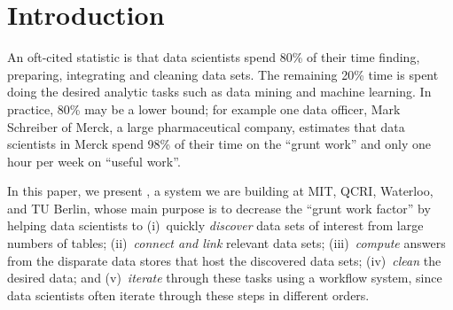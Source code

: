 \section{Introduction}
\label{introduction}

An oft-cited statistic is that data scientists spend 80\% of their time finding, preparing, integrating and cleaning data sets. The remaining 20\% time is spent doing the desired analytic tasks such as data mining and machine learning. In practice, 80\% may be a lower bound; for example one data officer, Mark Schreiber of Merck, a large pharmaceutical company, estimates that data scientists in Merck spend 98\% of their time on the ``grunt work'' and only one hour per week on ``useful work''.

In this paper, we present \dcv, a system we are building at MIT, QCRI, Waterloo, and TU Berlin, whose main purpose is to decrease the ``grunt work factor'' by helping data scientists to 
(i)~quickly {\it discover} data sets of interest from large numbers of tables;
(ii)~{\it connect and link} relevant data sets;
(iii)~{\it compute} answers from the disparate data stores that host the discovered data sets;
(iv)~{\it clean} the desired data; and %
(v)~{\it iterate} through these tasks using a workflow system, since data scientists often iterate through these steps in different orders.


%
%
%
%
%
%
%
%
%
%


